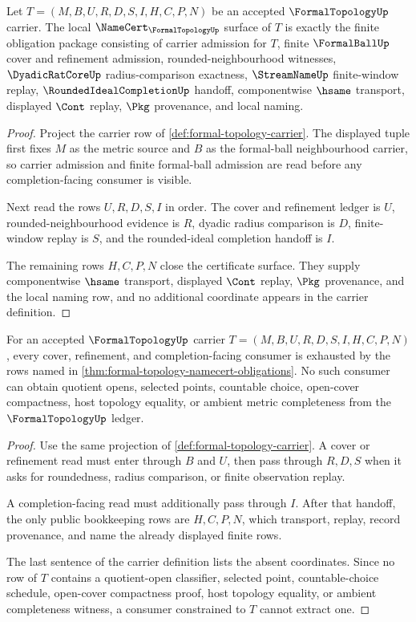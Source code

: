 \begin{theorem}
\label{thm:formal-topology-namecert-obligations}
Let $T=(M,B,U,R,D,S,I,H,C,P,N)$ be an accepted $\FormalTopologyUp$ carrier. The local $\NameCert_{\FormalTopologyUp}$ surface of $T$ is exactly the finite obligation package consisting of carrier admission for $T$, finite $\FormalBallUp$ cover and refinement admission, rounded-neighbourhood witnesses, $\DyadicRatCoreUp$ radius-comparison exactness, $\StreamNameUp$ finite-window replay, $\RoundedIdealCompletionUp$ handoff, componentwise $\hsame$ transport, displayed $\Cont$ replay, $\Pkg$ provenance, and local naming.
\begin{proof}
Project the carrier row of \autoref{def:formal-topology-carrier}. The displayed tuple first fixes $M$ as the metric source and $B$ as the formal-ball neighbourhood carrier, so carrier admission and finite formal-ball admission are read before any completion-facing consumer is visible.

Next read the rows $U,R,D,S,I$ in order. The cover and refinement ledger is $U$, rounded-neighbourhood evidence is $R$, dyadic radius comparison is $D$, finite-window replay is $S$, and the rounded-ideal completion handoff is $I$.

The remaining rows $H,C,P,N$ close the certificate surface. They supply componentwise $\hsame$ transport, displayed $\Cont$ replay, $\Pkg$ provenance, and the local naming row, and no additional coordinate appears in the carrier definition.
\end{proof}
\end{theorem}
\begin{theorem}
\label{thm:formal-topology-ledger-nonescape}
For an accepted $\FormalTopologyUp$ carrier $T=(M,B,U,R,D,S,I,H,C,P,N)$, every cover, refinement, and completion-facing consumer is exhausted by the rows named in \autoref{thm:formal-topology-namecert-obligations}. No such consumer can obtain quotient opens, selected points, countable choice, open-cover compactness, host topology equality, or ambient metric completeness from the $\FormalTopologyUp$ ledger.
\begin{proof}
Use the same projection of \autoref{def:formal-topology-carrier}. A cover or refinement read must enter through $B$ and $U$, then pass through $R,D,S$ when it asks for roundedness, radius comparison, or finite observation replay.

A completion-facing read must additionally pass through $I$. After that handoff, the only public bookkeeping rows are $H,C,P,N$, which transport, replay, record provenance, and name the already displayed finite rows.

The last sentence of the carrier definition lists the absent coordinates. Since no row of $T$ contains a quotient-open classifier, selected point, countable-choice schedule, open-cover compactness proof, host topology equality, or ambient completeness witness, a consumer constrained to $T$ cannot extract one.
\end{proof}
\end{theorem}

